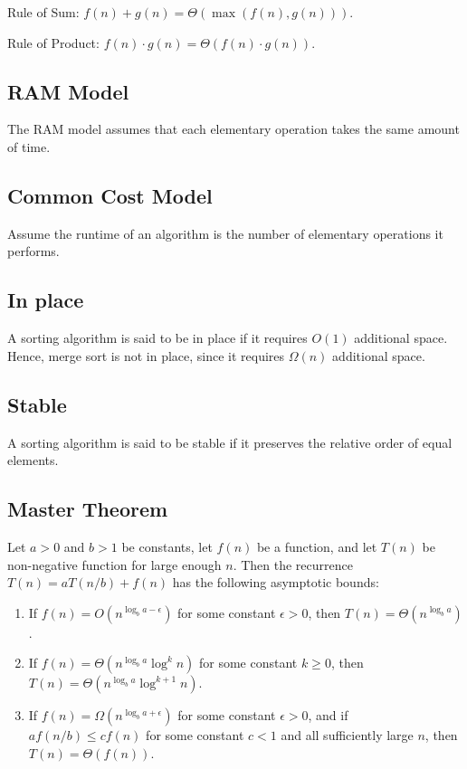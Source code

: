 \documentclass[a4paper,12pt]{article}
\begin{document}
Rule of Sum: $f(n) + g(n) = \Theta(\max(f(n), g(n)))$.

Rule of Product: $f(n) \cdot g(n) = \Theta(f(n) \cdot g(n))$.

\subsection{RAM Model}

The RAM model assumes that each elementary operation takes the same amount of time.

\subsection{Common Cost Model}

Assume the runtime of an algorithm is the number of elementary operations it performs.

\subsection{In place}

A sorting algorithm is said to be in place if it requires $O(1)$ additional space.
Hence, merge sort is not in place, since it requires $\Omega(n)$ additional space.

\subsection{Stable}

A sorting algorithm is said to be stable if it preserves the relative order of equal elements.

\subsection{Master Theorem}

Let $a > 0$ and $b > 1$ be constants, let $f(n)$ be a function, and let $T(n)$ be non-negative function for large enough $n$.
Then the recurrence $T(n) = a T(n / b) + f(n)$ has the following asymptotic bounds:

\begin{enumerate}
	\item If $f(n) = O(n^{\log_b a - \epsilon})$ for some constant $\epsilon > 0$, then $T(n) = \Theta(n^{\log_b a})$.
	\item If $f(n) = \Theta(n^{\log_b a} \log^k n)$ for some constant $k \geq 0$, then $T(n) = \Theta(n^{\log_b a} \log^{k + 1} n)$.
	\item If $f(n) = \Omega(n^{\log_b a + \epsilon})$ for some constant $\epsilon > 0$, and if $a f(n / b) \leq c f(n)$ for some constant $c < 1$ and all sufficiently large $n$, then $T(n) = \Theta(f(n))$.
\end{enumerate}
\end{document}
